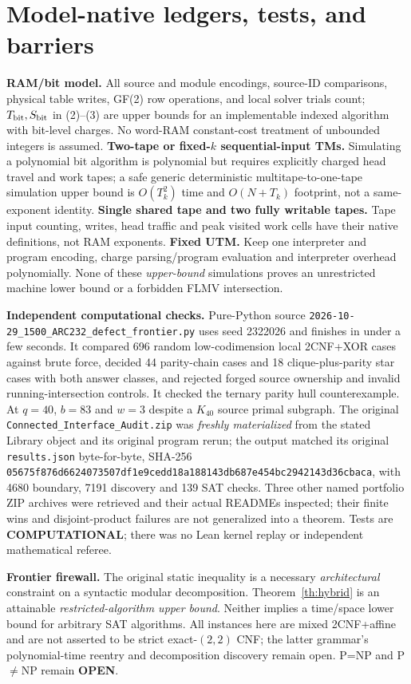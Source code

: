 \documentclass[10pt]{article}
\begin{document}
\section{Model-native ledgers, tests, and barriers}
\noindent\textbf{RAM/bit model.} All source and module encodings, source-ID comparisons, physical table writes, GF(2) row operations, and local solver trials count; $T_{\rm bit},S_{\rm bit}$ in (2)--(3) are upper bounds for an implementable indexed algorithm with bit-level charges. No word-RAM constant-cost treatment of unbounded integers is assumed. \textbf{Two-tape or fixed-$k$ sequential-input TMs.} Simulating a polynomial bit algorithm is polynomial but requires explicitly charged head travel and work tapes; a safe generic deterministic multitape-to-one-tape simulation upper bound is $O(T_k^2)$ time and $O(N+T_k)$ footprint, not a same-exponent identity. \textbf{Single shared tape and two fully writable tapes.} Tape input counting, writes, head traffic and peak visited work cells have their native definitions, not RAM exponents. \textbf{Fixed UTM.} Keep one interpreter and program encoding, charge parsing/program evaluation and interpreter overhead polynomially. None of these \emph{upper-bound} simulations proves an unrestricted machine lower bound or a forbidden FLMV intersection.

\noindent\textbf{Independent computational checks.} Pure-Python source \texttt{2026-10-29\_1500\_ARC232\_defect\_frontier.py} uses seed 2322026 and finishes in under a few seconds. It compared 696 random low-codimension local 2CNF+XOR cases against brute force, decided 44 parity-chain cases and 18 clique-plus-parity star cases with both answer classes, and rejected forged source ownership and invalid running-intersection controls. It checked the ternary parity hull counterexample. At $q=40$, $b=83$ and $w=3$ despite a $K_{40}$ source primal subgraph. The original \texttt{Connected\_Interface\_Audit.zip} was \emph{freshly materialized} from the stated Library object and its original program rerun; the output matched its original \texttt{results.json} byte-for-byte, SHA-256 \texttt{05675f876d6624073507df1e9cedd18a188143db687e454bc2942143d36cbaca}, with 4680 boundary, 7191 discovery and 139 SAT checks. Three other named portfolio ZIP archives were retrieved and their actual READMEs inspected; their finite wins and disjoint-product failures are not generalized into a theorem. Tests are \textbf{COMPUTATIONAL}; there was no Lean kernel replay or independent mathematical referee.

\noindent\textbf{Frontier firewall.} The original static inequality is a necessary \emph{architectural} constraint on a syntactic modular decomposition. Theorem~\ref{th:hybrid} is an attainable \emph{restricted-algorithm upper bound}. Neither implies a time/space lower bound for arbitrary SAT algorithms. All instances here are mixed 2CNF+affine and are not asserted to be strict exact-$(2,2)$ CNF; the latter grammar's polynomial-time reentry and decomposition discovery remain open. P=NP and P$\ne$NP remain \textbf{OPEN}.
\end{document}
